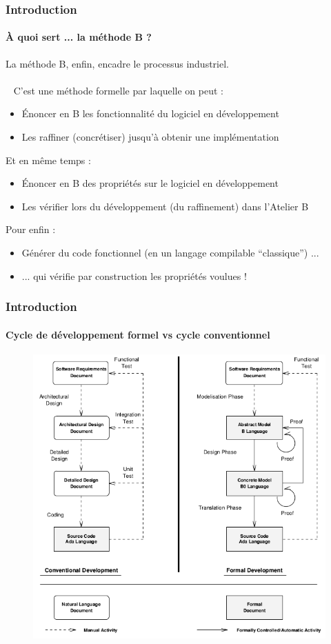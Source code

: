 \documentclass[11pt,a4paper,xcolor=table]{beamer} %
\begin{document}
\begin{frame}
\frametitle{Introduction}
\framesubtitle{À quoi sert ... la méthode B ?}
La méthode B, enfin, encadre le processus industriel.\\~\\~\pause
C'est une méthode formelle par laquelle on peut :\pause
\begin{itemize}
\item Énoncer en B les fonctionnalité du logiciel en développement
\pause
\item Les raffiner (concrétiser) jusqu'à obtenir une implémentation
\pause
\end{itemize}
Et en même temps :\pause
\begin{itemize}
\item Énoncer en B des propriétés sur le logiciel en développement
\pause
\item Les vérifier lors du développement (du raffinement) dans l'Atelier B
\pause
\end{itemize}
Pour enfin :
\begin{itemize}
\item Générer du code fonctionnel (en un langage compilable ``classique'') ...
\pause
\item ... qui vérifie par construction les propriétés voulues !
\end{itemize}
\end{frame}


\begin{frame}
\frametitle{Introduction} 
\framesubtitle{Cycle de développement formel vs cycle conventionnel}
\begin{figure}[h]
\centering
\includegraphics[scale=0.33]{ressources/formal_dev.png}
\end{figure}
\end{frame}
\end{document}

